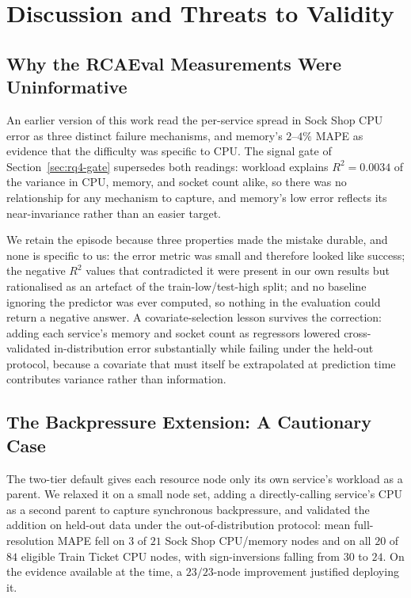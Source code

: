 \documentclass[journal, 10pt]{IEEEtran}
\begin{document}
\section{Discussion and Threats to Validity}
\label{sec:discussion}

\subsection{Why the RCAEval Measurements Were Uninformative}
\label{sec:cpu-ceiling}
An earlier version of this work read the per-service spread in Sock Shop CPU
error as three distinct failure mechanisms, and memory's $2$--$4\%$ MAPE as
evidence that the difficulty was specific to CPU. The signal gate of
Section~\ref{sec:rq4-gate} supersedes both readings: workload explains
$R^2 = 0.0034$ of the variance in CPU, memory, and socket count alike, so there
was no relationship for any mechanism to capture, and memory's low error reflects
its near-invariance rather than an easier target.

We retain the episode because three properties made the mistake durable, and none
is specific to us: the error metric was small and therefore looked like success;
the negative $R^2$ values that contradicted it were present in our own results but
rationalised as an artefact of the train-low/test-high split; and no baseline
ignoring the predictor was ever computed, so nothing in the evaluation could
return a negative answer. A covariate-selection lesson survives the correction:
adding each service's memory and socket count as regressors lowered
cross-validated in-distribution error substantially while failing under the
held-out protocol, because a covariate that must itself be extrapolated at
prediction time contributes variance rather than information.


\subsection{The Backpressure Extension: A Cautionary Case}
\label{sec:backpressure-edge}

The two-tier default gives each resource node only its own service's workload as
a parent. We relaxed it on a small node set, adding a directly-calling service's
CPU as a second parent to capture synchronous backpressure, and validated the
addition on held-out data under the out-of-distribution protocol: mean
full-resolution MAPE fell on $3$ of $21$ Sock Shop CPU/memory nodes and on all
$20$ of $84$ eligible Train Ticket CPU nodes, with sign-inversions falling from
$30$ to $24$. On the evidence available at the time, a $23/23$-node improvement
justified deploying it.
\end{document}
